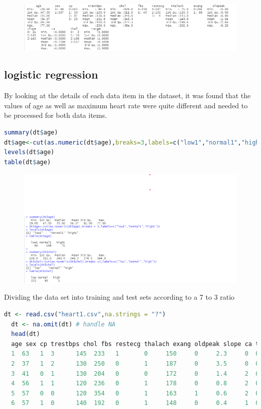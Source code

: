 \documentclass{article}
\begin{document}
  \begin{figure}[H]
    \centering
    \includegraphics[width=1\textwidth]{task1_1_dtSummary.png}
  \end{figure}

\subsection{logistic regression}
By looking at the details of each data item in the dataset, it was found that the values of age as well as maximum heart rate were quite different and needed to be processed for both data items.
\begin{lstlisting}[language=R]
summary(dt$age)
dt$age<-cut(as.numeric(dt$age),breaks=3,labels=c("low1","normal1","high1"))
levels(dt$age)
table(dt$age)
\end{lstlisting}
\begin{figure}[H]
  \centering
  \includegraphics[width=1\textwidth]{task1_1_ageSummary.png}
\end{figure}
Dividing the data set into training and test sets according to a 7 to 3 ratio
\clearpage
\begin{lstlisting}[language=R]
  dt <- read.csv("heart1.csv",na.strings = "?")
  dt <- na.omit(dt) # handle NA
  head(dt)
  age sex cp trestbps chol fbs restecg thalach exang oldpeak slope ca thal target
  1  63   1  3      145  233   1       0     150     0     2.3     0  0    1      1
  2  37   1  2      130  250   0       1     187     0     3.5     0  0    2      1
  3  41   0  1      130  204   0       0     172     0     1.4     2  0    2      1
  4  56   1  1      120  236   0       1     178     0     0.8     2  0    2      1
  5  57   0  0      120  354   0       1     163     1     0.6     2  0    2      1
  6  57   1  0      140  192   0       1     148     0     0.4     1  0    1      1
  \end{lstlisting}
\end{document}
